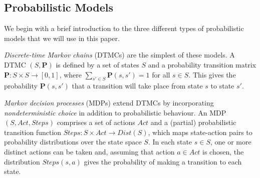 \documentclass{llncs}
\begin{document}

\subsection{Probabilistic Models}
We begin with a brief introduction to the three different types of probabilistic models
that we will use in this paper.

\emph{Discrete-time Markov chains} (DTMCs) are the simplest of these models.
A DTMC $(S,\mathbf{P})$ is defined by a set of states $S$ and a probability transition matrix
$\mathbf{P} : S\times S \rightarrow [0, 1]$, where $\sum_{s'\in S} \mathbf{P}(s, s') = 1$ for all $s \in  S$.
This gives the probability $\mathbf{P}(s, s')$ that a transition will take place from state $s$ to state $s'$.

\emph{Markov decision processes} (MDPs) extend DTMCs by incorporating \emph{nondeterministic choice}
in addition to probabilistic behaviour.
An MDP $(S,Act,Steps)$ comprises a set of actions $Act$
and a (partial) probabilistic transition function $Steps:S\times Act\rightarrow Dist(S)$,
which maps state-action pairs to probability distributions over the state space $S$.
In each state $s\in S$, one or more distinct actions can be taken and, assuming that action $a\in Act$ is chosen,
the distribution $Steps(s,a)$ gives the probability of making a transition to each state.


\end{document}
